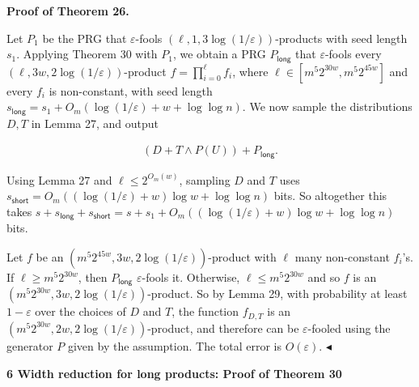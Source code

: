 \par\medskip\noindent\textbf{Proof of Theorem 26.}\par




Let $P_{1}$ be the PRG that $\varepsilon$-fools $(\ell,1,3\log(1/\varepsilon))$-products with seed length $s_{1}$.
Applying Theorem 30 with $P_{1}$, we obtain a PRG $P_{\mathsf{long}}$ that $\varepsilon$-fools every $(\ell,3w,2\log(1/\varepsilon))$-product $f=\prod_{i=0}^{\ell}f_{i}$, where $\ell\in[m^{5}2^{30w},m^{5}2^{45w}]$ and every $f_{i}$ is non-constant, with seed length $s_{\mathsf{long}}=s_{1}+O_{m}(\log(1/\varepsilon)+w+\log\log n)$.
We now sample the distributions $D,T$ in Lemma 27, and output\par


\[\begin{gathered}
(D+T\wedge P(U))+P_{\mathsf{long}}.
\end{gathered}\]


Using Lemma 27 and $\ell\leq 2^{O_{m}(w)}$, sampling $D$ and $T$ uses $s_{\mathsf{short}}=O_{m}((\log(1/\varepsilon)+w)\log w+\log\log n)$ bits.
So altogether this takes $s+s_{\mathsf{long}}+s_{\mathsf{short}}=s+s_{1}+O_{m}((\log(1/\varepsilon)+w)\log w+\log\log n)$ bits.\par




Let $f$ be an $(m^{5}2^{45w},3w,2\log(1/\varepsilon))$-product with $\ell$ many non-constant $f_{i}$’s.
If $\ell\geq m^{5}2^{30w}$, then $P_{\mathsf{long}}$ $\varepsilon$-fools it.
Otherwise, $\ell\leq m^{5}2^{30w}$ and so $f$ is an $(m^{5}2^{30w},3w,2\log(1/\varepsilon))$-product.
So by Lemma 29, with probability at least $1-\varepsilon$ over the choices of $D$ and $T$, the function $f_{D,T}$ is an $(m^{5}2^{30w},2w,2\log(1/\varepsilon))$-product, and therefore can be $\varepsilon$-fooled using the generator $P$ given by the assumption.
The total error is $O(\varepsilon)$.
$\blacktriangleleft$\par







\par\medskip\noindent\textbf{
6 Width reduction for long products: Proof of Theorem 30
}\par




